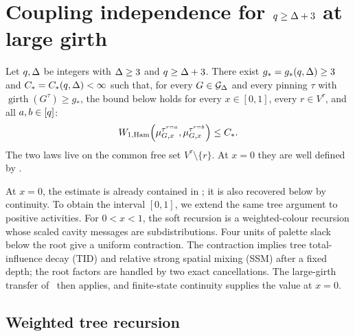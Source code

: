 \section{\texorpdfstring{Coupling independence for \(q\ge\Deg+3\) at large girth}
{Coupling independence for q >= Delta + 3 at large girth}}
\label{sec:high-girth-soft}

\begin{theorem}
\label{thm:high-girth-soft-ci}
Let $q,\Deg$ be integers with $\Deg\ge3$ and $q\ge\Deg+3$.  There exist
$g_*=g_*(q,\Deg)\ge3$ and $C_*=C_*(q,\Deg)<\infty$ such that, for every
$G\in\Gdeg$ and every pinning $\tau$ with
\(\operatorname{girth}(G^\tau)\ge g_*\), the bound
below holds for every $x\in[0,1]$, every $r\in V^\tau$, and all
$a,b\in\colours$:
\[
  \WHam\!\left(
    \mupin{G}{\tau^{r=a}}{x},
    \mupin{G}{\tau^{r=b}}{x}
  \right)\le C_*.
\]
The two laws live on the common free set $V^\tau\setminus\{r\}$.  At $x=0$
they are well defined by .
\end{theorem}

At $x=0$, the estimate is already contained in
\cite[Theorem~5.10 and Lemma~5.13]{CLMM2023}; it is also recovered below by
continuity.  To obtain the interval $[0,1]$, we extend the same tree argument
to positive activities.  For $0<x<1$, the soft recursion is a weighted-colour
recursion whose scaled cavity messages are subdistributions.  Four units of
palette slack below the root give a uniform contraction.  The contraction
implies tree total-influence decay (TID) and relative strong spatial mixing
(SSM) after a fixed depth; the root factors are handled by two exact
cancellations.
The large-girth transfer of~\cite{CLMM2023} then applies, and finite-state
continuity supplies the value at $x=0$.

\subsection{Weighted tree recursion}
\label{sec:hg-weighted-recursion}

